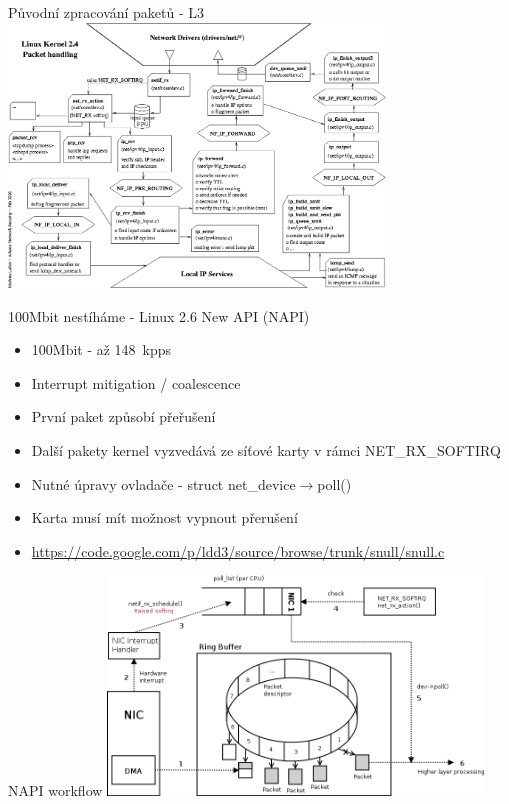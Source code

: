 \documentclass{beamer}
\begin{document}
\begin{frame}{Původní zpracování paketů - L3}
	\centering
	\includegraphics[width=10cm,keepaspectratio]{fig/kernel_24.png}
\end{frame}

\begin{frame}{100Mbit nestíháme - Linux 2.6 New API (NAPI)}
	\begin{itemize}
		\item 100Mbit - až 148~kpps
		\item Interrupt mitigation / coalescence
		\item První paket způsobí přeřušení
		\item Další pakety kernel vyzvedává ze síťové karty v rámci NET\_RX\_SOFTIRQ
		\item Nutné úpravy ovladače - struct net\_device$\rightarrow$poll()
		\item Karta musí mít možnost vypnout přerušení
		\item {\url{https://code.google.com/p/ldd3/source/browse/trunk/snull/snull.c}}
	\end{itemize}
\end{frame}

\begin{frame}{NAPI workflow}
	\centering
	\includegraphics[width=10cm,keepaspectratio]{fig/napi-workflow.png}
\end{frame}
\end{document}
